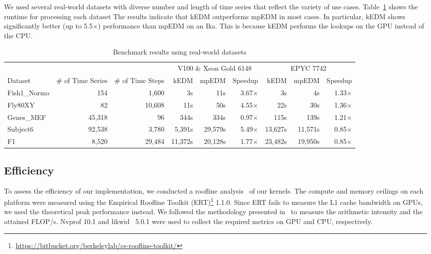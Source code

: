 \documentclass[conference]{IEEEtran}
\begin{document}
We used several real-world datasets with diverse number and length of time
series that reflect the variety of use cases.
Table~\ref{tbl:real-world} shows the runtime for processing each dataset The
results indicate that kEDM outperforms mpEDM in most cases. In particular,
kEDM shows significantly better (up to 5.5$\times$) performance than mpEDM on
an Ika\@. This is because kEDM performs the lookups on the GPU instead of the
CPU\@.

\begin{table}
\centering
\caption{Benchmark results using real-world datasets}%
\label{tbl:real-world}
\begin{tabular}{@{}lrrrrrrrr@{}}
\toprule
             & \multicolumn{1}{c}{} & \multicolumn{1}{c}{} & \multicolumn{3}{c}{V100 \& Xeon Gold 6148 } & \multicolumn{3}{c}{EPYC 7742} \\ \cmidrule(l){4-6}  \cmidrule(l){7-9}
Dataset      & \multicolumn{1}{c}{\# of Time Series} & \multicolumn{1}{c}{\# of Time Steps} & kEDM & mpEDM & Speedup & kEDM & mpEDM & Speedup \\ \midrule
Fish1\_Normo & 154    & 1,600  &      3s &     11s & 3.67$\times$ &      3s &      4s & 1.33$\times$ \\
Fly80XY      & 82     & 10,608 &     11s &     50s & 4.55$\times$ &     22s &     30s & 1.36$\times$ \\
Genes\_MEF   & 45,318 & 96     &    344s &    334s & 0.97$\times$ &    115s &    139s & 1.21$\times$ \\
Subject6     & 92,538 & 3,780  &  5,391s & 29,579s & 5.49$\times$ & 13,627s & 11,571s & 0.85$\times$ \\
F1           & 8,520  & 29,484 & 11,372s & 20,128s & 1.77$\times$ & 23,482s & 19,950s & 0.85$\times$ \\ \bottomrule
\end{tabular}
\end{table}

\subsection{Efficiency}

To assess the efficiency of our implementation, we conducted a roofline
analysis~\cite{Williams2008} of our kernels. The compute and memory ceilings
on each platform were measured using the Empirical Roofline Toolkit (ERT)\footnote{\url{https://bitbucket.org/berkeleylab/cs-roofline-toolkit/}} 1.1.0.
Since ERT fails to measure the L1 cache bandwidth on GPUs, we used the
theoretical peak performance instead. We followed the methodology presented
in~\cite{Yang2020a,Yang2020b} to measure the arithmetic intensity and the
attained FLOP/s. Nvprof 10.1 and likwid~\cite{Treibig2010} 5.0.1 were used to
collect the required metrics on GPU and CPU, respectively.
\end{document}
